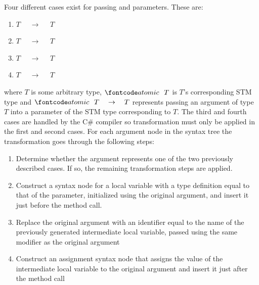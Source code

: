 Four different cases exist for passing  and  parameters. These are:
\begin{enumerate}
	\item $T$ $\quad \rightarrow \quad$  $T$
	\item {} $T$ $\quad \rightarrow\quad$ $T$
	\item {} $T$ $\quad \rightarrow\quad$  $T$
	\item $T$ $\quad \rightarrow \quad$ $T$
\end{enumerate} 
where $T$ is some arbitrary type, $\text{ } \bscode{atomic} \quad  T$ is $T$'s corresponding \ac{STM} type and $\text{ } \bscode{atomic} \quad T \quad \rightarrow \quad T$ represents passing an argument of type $T$ into a parameter of the \ac{STM} type corresponding to $T$. The third and fourth cases are handled by the C\# compiler so transformation must only be applied in the first and second cases.
For each argument node in the syntax tree the transformation goes through the following steps:
\begin{enumerate}
	\item Determine whether the argument represents one of the two previously described cases. If so, the remaining transformation steps are applied.
	\item Construct a syntax node for a local variable with a type definition equal to that of the parameter, initialized using the original argument, and insert it just before the method call.
	\item Replace the original argument with an identifier equal to the name of the previously generated intermediate local variable, passed using the same modifier as the original argument
	\item Construct an assignment syntax node that assigns the value of the intermediate local variable to the original argument and insert it just after the method call
\end{enumerate}

